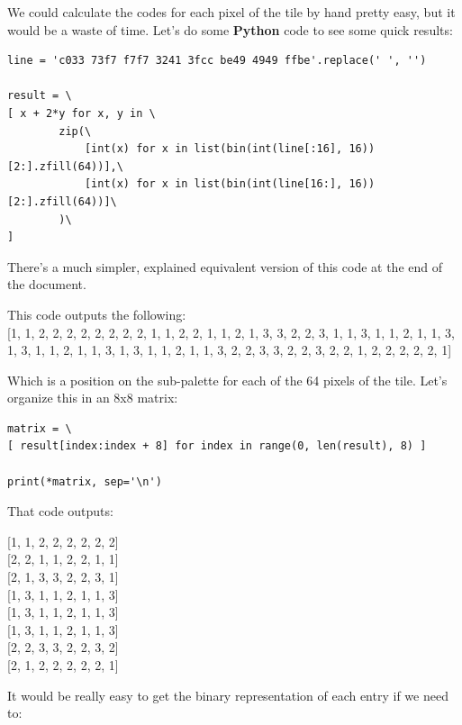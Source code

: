 \documentclass{article}
\begin{document}
\vskip 0.5in

We could calculate the codes for each pixel of the tile by hand pretty easy, but it would be a waste of time. Let's do some \textbf{Python} code to see some quick results:

\begin{lstlisting}
line = 'c033 73f7 f7f7 3241 3fcc be49 4949 ffbe'.replace(' ', '')

result = \
[ x + 2*y for x, y in \
        zip(\
            [int(x) for x in list(bin(int(line[:16], 16))[2:].zfill(64))],\
            [int(x) for x in list(bin(int(line[16:], 16))[2:].zfill(64))]\
        )\
]
\end{lstlisting}

There's a much simpler, explained equivalent version of this code at the end of the document.
\vskip 0.2in

This code outputs the following: \\

[1, 1, 2, 2, 2, 2, 2, 2, 2, 2, 1, 1, 2, 2, 1, 1, 2, 1, 3, 3, 2, 2, 3, 1, 1, 3, 1, 1, 2, 1, 1, 3, 1, 3, 1, 1, 2, 1, 1, 3, 1, 3, 1, 1, 2, 1, 1, 3, 2, 2, 3, 3, 2, 2, 3, 2, 2, 1, 2, 2, 2, 2, 2, 1]
\vskip 0.2in

Which is a position on the sub-palette for each of the 64 pixels of the tile. Let's organize this in an 8x8 matrix:

\begin{lstlisting}
matrix = \
[ result[index:index + 8] for index in range(0, len(result), 8) ]

print(*matrix, sep='\n')
\end{lstlisting}

That code outputs:
\parbox{.45\linewidth}{
\begin{center}
  [1, 1, 2, 2, 2, 2, 2, 2] \\[0pt]
  [2, 2, 1, 1, 2, 2, 1, 1] \\[0pt]
  [2, 1, 3, 3, 2, 2, 3, 1] \\[0pt]
  [1, 3, 1, 1, 2, 1, 1, 3] \\[0pt]
  [1, 3, 1, 1, 2, 1, 1, 3] \\[0pt]
  [1, 3, 1, 1, 2, 1, 1, 3] \\[0pt]
  [2, 2, 3, 3, 2, 2, 3, 2] \\[0pt]
  [2, 1, 2, 2, 2, 2, 2, 1] \\[0pt]
\end{center}
}
\vskip 0.2in

It would be really easy to get the binary representation of each entry if we need to:
\end{document}
